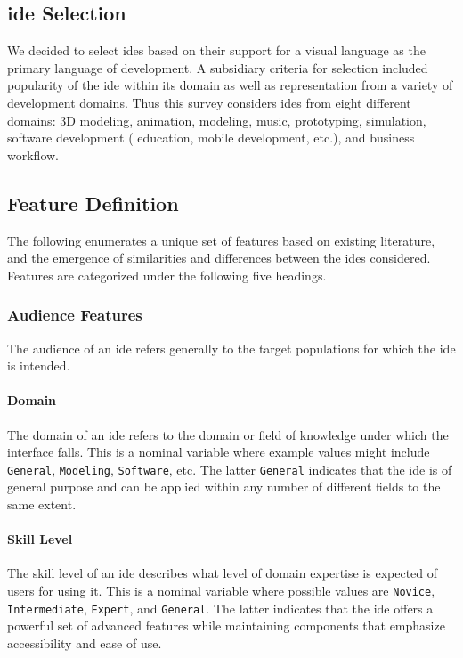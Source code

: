 \subsection{\acs{ide} Selection} \label{subsec:ideselection}

We decided to select \acp{ide} based on their support for a visual language
as the primary language of development.  A subsidiary criteria for
selection included popularity of the \ac{ide} within its domain as well as
representation from a variety of development domains.  Thus this survey
considers \acp{ide} from eight different domains: 3D modeling, animation,
modeling, music, prototyping, simulation, software development (\eg
education, mobile development, etc.), and business workflow.


\subsection{Feature Definition} \label{subsec:featuredefinition}

The following enumerates a unique set of features based on existing literature, and the emergence of similarities and differences between the \acp{ide} considered.
Features are categorized under the following five headings.


\subsubsection{Audience Features} \label{subsubsec:audience}

The audience of an \ac{ide} refers generally to the target populations for which
the \ac{ide} is intended.


\paragraph{Domain}
The domain of an \ac{ide} refers to the domain or field of
knowledge under which the interface falls.
This is a nominal variable where example values might include \texttt{General}, \texttt{Modeling}, \texttt{Software}, etc.
The latter \texttt{General} indicates that the \ac{ide} is of general purpose and can be applied within any number of different fields to the same extent.


\paragraph{Skill Level}
The skill level of an \ac{ide} describes what level of domain expertise is expected of users for using it.
This is a nominal variable where possible values are \texttt{Novice}, \texttt{Intermediate}, \texttt{Expert}, and \texttt{General}.
The latter indicates that the \ac{ide} offers a powerful set of advanced features while maintaining components that emphasize accessibility and ease of use.


